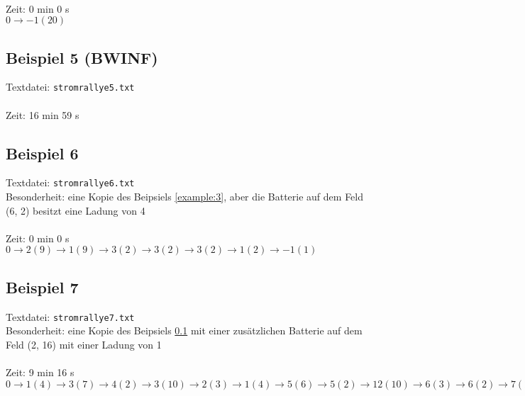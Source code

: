 \documentclass[a4paper,10pt,ngerman]{scrartcl}
\begin{document}
\noindent
{}\\

\noindent
Zeit: 0 min 0 s\\

\noindent
$0 \rightarrow -1(20)$

\subsection{Beispiel 5 (BWINF)}\label{example:5}
Textdatei: \texttt{stromrallye5.txt}\\

\noindent
{}\\

\noindent
Zeit: 16 min 59 s

\subsection{Beispiel 6}\label{example:6}
Textdatei: \texttt{stromrallye6.txt}\\
Besonderheit: eine Kopie des Beipsiels \ref{example:3}, aber die Batterie auf dem Feld (6, 2) besitzt eine Ladung von 4\\

\noindent
{}\\

\noindent
Zeit: 0 min 0 s\\

\noindent
$0 \rightarrow2(9) \rightarrow 1(9) \rightarrow 3(2) \rightarrow 3(2) \rightarrow 3(2) \rightarrow 1(2) \rightarrow -1(1)$

\noindent
\subsection{Beispiel 7}\label{example:7}
Textdatei: \texttt{stromrallye7.txt}\\
Besonderheit: eine Kopie des Beipsiels \ref{example:5} mit einer zusätzlichen Batterie auf dem Feld (2, 16) mit einer Ladung von 1\\

\noindent
{}\\

\noindent
Zeit: 9 min 16 s\\

\noindent
$0 \rightarrow 1(4) \rightarrow 3(7) \rightarrow 4(2) \rightarrow 3(10) \rightarrow 2(3) \rightarrow 1(4) \rightarrow 5(6) \rightarrow 5(2) 
\rightarrow 12(10) \rightarrow 6(3) \rightarrow 6(2) \rightarrow 7(2) \rightarrow 8(2) \rightarrow 9(2) \rightarrow 10(2) \rightarrow 11(2) 
\rightarrow 13(1) \rightarrow 14(1) \rightarrow 15(1) \rightarrow 16(1) \rightarrow 17(1) \rightarrow 18(1) \rightarrow 19(1) \rightarrow 20(3) 
\rightarrow 21(1) \rightarrow 22(1) \rightarrow 23(1) \rightarrow 24(1) \rightarrow 25(1) \rightarrow 28(1) \rightarrow 27(1) \rightarrow 26(1) 
\rightarrow 27(1) \rightarrow 30(1) \rightarrow 31(1) \rightarrow 30(1) \rightarrow 33(1) \rightarrow 34(1) \rightarrow 35(1) \rightarrow 32(1) 
\rightarrow 29(1) \rightarrow -1(1) $
\end{document}
